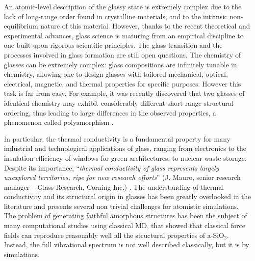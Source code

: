 An atomic-level description of the glassy state is extremely complex due to the lack of long-range order found in crystalline materials, and to the intrinsic non-equilibrium nature of this material. However, thanks to the recent theoretical and experimental advances, glass science is maturing from an empirical discipline to one built upon rigorous scientific principles. 
The glass transition and the processes involved in glass formation are still open questions. 
The chemistry of glasses can be extremely complex: glass compositions are infinitely tunable in chemistry, allowing one to design glasses with tailored mechanical, optical, electrical, magnetic, and thermal properties for specific purposes. 
However this task is far from easy. For example, it was recently discovered that two glasses of identical chemistry may exhibit considerably different short-range structural ordering, thus leading to large differences in the observed properties, a phenomenon called polyamorphism \cite{Huang2004,McMillan2004}. 

In particular, the thermal conductivity is a fundamental property for many industrial and technological applications of glass, ranging from electronics to the insulation efficiency of windows for green architectures, to nuclear waste storage. Despite its importance, ``\emph{thermal conductivity of glass represents largely unexplored territories, ripe for new research efforts}'' (J. Mauro, senior research manager -- Glass Research, Corning Inc.) \cite{MauroFM14}. 
The understanding of thermal conductivity and its structural origin in glasses has been greatly overlooked in the literature and presents several non trivial challenges for atomistic simulations. 
The problem of generating faithful amorphous structures has been the subject of many computational studies using classical MD, that showed that classical force fields can reproduce reasonably well all the structural properties of a-SiO$_2$. 
Instead, the full vibrational spectrum is not well described classically, but it is by \abinitio simulations. 


